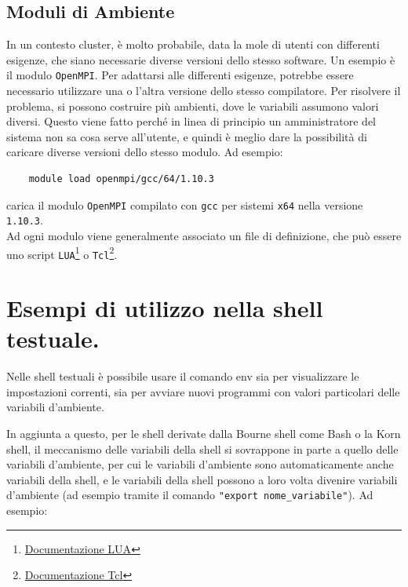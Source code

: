 \documentclass[11pt]{book}
\begin{document}
\subsection{Moduli di Ambiente}
In un contesto cluster, è molto probabile, data la mole di utenti con differenti esigenze, che siano necessarie diverse versioni dello stesso software. Un esempio è il modulo \verb*|OpenMPI|. Per adattarsi alle differenti esigenze, potrebbe essere necessario utilizzare una o l'altra versione dello stesso compilatore. Per risolvere il problema, si possono costruire più ambienti, dove le variabili assumono valori diversi. Questo viene fatto perché in linea di principio un amministratore del sistema non sa cosa serve all'utente, e quindi è meglio dare la possibilità di caricare diverse versioni dello stesso modulo. Ad esempio:
\begin{verbatim}
	module load openmpi/gcc/64/1.10.3
\end{verbatim}
carica il modulo \verb*|OpenMPI| compilato con \verb*|gcc| per sistemi \verb*|x64| nella versione \verb*|1.10.3|. \\
Ad ogni modulo viene generalmente associato un file di definizione, che può essere uno script \verb*|LUA|\footnote{\hyperref{https://www.lua.org/}{docu}{LUA}{Documentazione LUA}} o \verb*|Tcl|\footnote{\hyperref{https://www.tcl.tk/}{docu}{tcl}{Documentazione Tcl}}.

\section{Esempi di utilizzo nella shell testuale.}
Nelle shell testuali è possibile usare il comando env sia per visualizzare le impostazioni correnti, sia per avviare nuovi programmi con valori particolari delle variabili d'ambiente.

In aggiunta a questo, per le shell derivate dalla Bourne shell come Bash o la Korn shell, il meccanismo delle variabili della shell si sovrappone in parte a quello delle variabili d'ambiente, per cui le variabili d'ambiente sono automaticamente anche variabili della shell, e le variabili della shell possono a loro volta divenire variabili d'ambiente (ad esempio tramite il comando \verb*|"export nome_variabile"|). Ad esempio:
\end{document}
